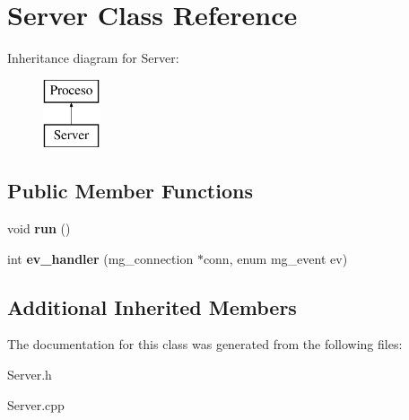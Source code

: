\hypertarget{classServer}{\section{Server Class Reference}
\label{classServer}
}
Inheritance diagram for Server\-:\begin{figure}[H]
\begin{center}
\leavevmode
\includegraphics[height=2.000000cm]{classServer}
\end{center}
\end{figure}
\subsection*{Public Member Functions}
\begin{DoxyCompactItemize}
\item 
\hypertarget{classServer_abb27d30b40a94326e3fd629d3b30b7d5}{void {\bfseries run} ()}\label{classServer_abb27d30b40a94326e3fd629d3b30b7d5}

\item 
\hypertarget{classServer_a35ee7138b8d6f2aea6ecaf63dc874441}{int {\bfseries ev\-\_\-handler} (mg\-\_\-connection $\ast$conn, enum mg\-\_\-event ev)}\label{classServer_a35ee7138b8d6f2aea6ecaf63dc874441}

\end{DoxyCompactItemize}
\subsection*{Additional Inherited Members}


The documentation for this class was generated from the following files\-:\begin{DoxyCompactItemize}
\item 
Server.\-h\item 
Server.\-cpp\end{DoxyCompactItemize}
